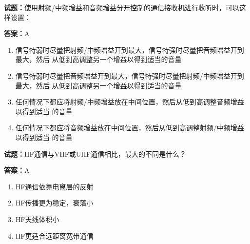 \documentclass{ctexbook}
\begin{document}




\vspace{1em}

\textbf{试题：}使用射频/中频增益和音频增益分开控制的通信接收机进行收听时，可以这样设置： 

\textbf{答案：}A 

\begin{enumerate}[leftmargin=3em]
  \item 信号特弱时尽量把射频/中频增益开到最大，信号特强时尽量把音频增益开到最大，然后
从低到高调整另一个增益以得到适当的音量 

  \item 信号特弱时尽量把音频增益开到最大，信号特强时尽量把射频/中频增益开到最大，然后
从低到高调整另一个增益以得到适当的音量 

  \item 任何情况下都应将射频/中频增益放在中间位置，然后从低到高调整音频增益以得到适当
的音量 

  \item 任何情况下都应将音频增益放在中间位置，然后从低到高调整射频/中频增益以得到适当
的音量 

\end{enumerate}





\vspace{1em}

\textbf{试题：}HF通信与VHF或UHF通信相比，最大的不同是什么？ 

\textbf{答案：}A 

\begin{enumerate}[leftmargin=3em]
  \item HF通信依靠电离层的反射 

  \item HF传播更为稳定，衰落小 

  \item HF天线体积小 

  \item HF更适合远距离宽带通信 

\end{enumerate}



\end{document}
